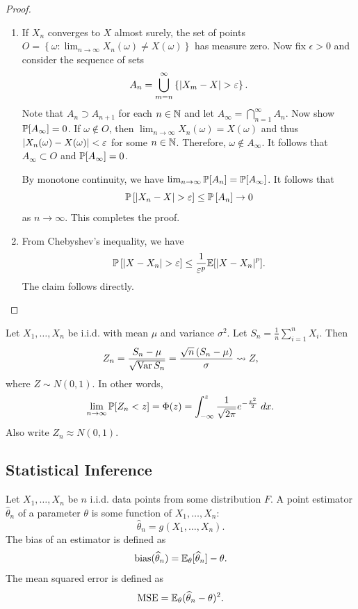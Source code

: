 \documentclass[a4paper]{article}
\begin{document}
\begin{proof}

\begin{enumerate}
  \item If $X_n$ converges to $X$ almost surely, 
  the set of points $O = \left\{ \omega : \lim_{n \to \infty}
  X_n(\omega) \neq X(\omega) \right\}$ has measure zero.
  Now fix $\epsilon > 0$ and consider the sequence of 
  sets 
  \[
  A_n = \bigcup_{m = n}^\infty \left\{ \abs{X_m - X} > \epsilon \right\}.
  \]
  Note that $A_n \supset A_{n+1}$ for each $n \in \N$ and 
  let $A_\infty = \bigcap_{n=1}^\infty A_n$. 
  Now show $\P[A_\infty] = 0$. If $\omega \notin O$, then 
  $\lim_{n \to \infty} X_n (\omega) = X(\omega)$ and thus 
  $\abs{X_n(\omega) - X(\omega)} < \epsilon$ for some $n \in \N$.
  Therefore, $\omega \notin A_\infty$.
  It follows that $A_\infty \subset O$ and $\P[A_\infty] = 0$. 
  
  By monotone 
  continuity, we have $\lim_{n \to \infty} \P[A_n] = 
  \P[A_\infty]$. It follows that
  \[
  \P \left[ \abs{X_n - X} > \epsilon \right] 
  \leq \P \left[ A_n \right] \to 0 
  \]
  as $n \to \infty$. This completes the proof.

  \item From Chebyshev's inequality, we have 
  \[
  \Prob \left[ \abs{X - X_n} > \epsilon \right] \leq 
  \frac{1}{\epsilon^p} \E [\abs{X - X_n}^p].
  \]
  The claim follows directly.
\end{enumerate}

\end{proof}

\begin{thm}
  Let $X_1, \dots, X_n$ be i.i.d. with mean $\mu$ and variance 
  $\sigma^2$. Let $S_n = \frac{1}{n} \sum_{i=1}^n X_i$.
  Then 
  \[
  Z_n = \frac{S_n - \mu}{\sqrt{\var S_n}}
  = \frac{\sqrt{n} \left( S_n - \mu \right)}{\sigma} 
  \convDist Z,
  \]
  where $Z \sim N(0, 1)$. In other words, 
  \[
  \lim_{n \to \infty} \P[Z_n < z] = \Phi(z) 
  = \int_{-\infty}^z \frac{1}{\sqrt{2\pi}} e^{- \frac{x^2}{2}} 
  \; dx.
  \]
  Also write $Z_n \approx N(0, 1)$.
\end{thm}

\subsection{Statistical Inference}

\begin{defi}
  Let $X_1, \dots, X_n$ be $n$ i.i.d. data points from some 
  distribution $F$. A point estimator $\hat{\theta}_n$ 
  of a parameter $\theta$ is some function of 
  $X_1, \dots, X_n$:
  \[
  \hat{\theta}_n = g(X_1, \dots, X_n).
  \]
  The bias of an estimator is defined as 
  \[
  \bias (\hat{\theta}_n)  
  = \E_\theta [\hat{\theta}_n] - \theta.
  \]
  The mean squared error is defined as 
  \[
  \mse = \E_\theta (\hat{\theta}_n - \theta)^2.
  \]
\end{defi}
\end{document}
